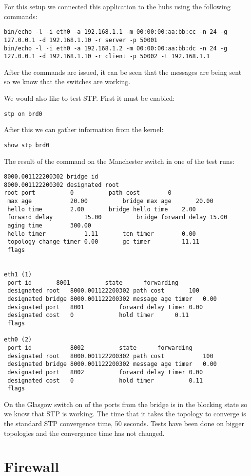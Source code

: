 For this setup we connected this application to the hubs using the following commands:
\begin{lstlisting}
bin/echo -l -i eth0 -a 192.168.1.1 -m 00:00:00:aa:bb:cc -n 24 -g 127.0.0.1 -d 192.168.1.10 -r server -p 50001
bin/echo -l -i eth0 -a 192.168.1.2 -m 00:00:00:aa:bb:dc -n 24 -g 127.0.0.1 -d 192.168.1.10 -r client -p 50002 -t 192.168.1.1
\end{lstlisting}
After the commands are issued, it can be seen that the messages are being sent so we know that the switches are working.

We would also like to test STP. First it must be enabled:
\begin{lstlisting}
stp on brd0
\end{lstlisting}
After this we can gather information from the kernel:
\begin{lstlisting}
show stp brd0
\end{lstlisting}
The result of the command on the Manchester switch in one of the test runs:
\begin{lstlisting}
8000.001122200302 bridge id		
8000.001122200302 designated root	
root port	       0		  path cost	       0
 max age	       20.00		  bridge max age       20.00
 hello time	       2.00		  bridge hello time    2.00
 forward delay	       15.00	  	  bridge forward delay 15.00
 aging time	       300.00
 hello timer	       1.11		  tcn timer	       0.00
 topology change timer 0.00		  gc timer	       11.11
 flags			


eth1 (1)
 port id	   8001		     state      forwarding
 designated root   8000.001122200302 path cost		 100
 designated bridge 8000.001122200302 message age timer	 0.00
 designated port   8001		     forward delay timer 0.00
 designated cost   0		     hold timer		 0.11
 flags			

eth0 (2)
 port id           8002		     state      forwarding
 designated root   8000.001122200302 path cost           100
 designated bridge 8000.001122200302 message age timer   0.00
 designated port   8002		     forward delay timer 0.00
 designated cost   0		     hold timer	         0.11
 flags			
\end{lstlisting}
On the Glasgow switch on of the ports from the bridge is in the blocking state
so we know that STP is working. The time that it takes the topology to converge
is the standard STP convergence time, 50 seconds. Tests have been done on bigger
topologies and the convergence time has not changed.

\section{Firewall}
\label{sub-sec:firewall-impl}

